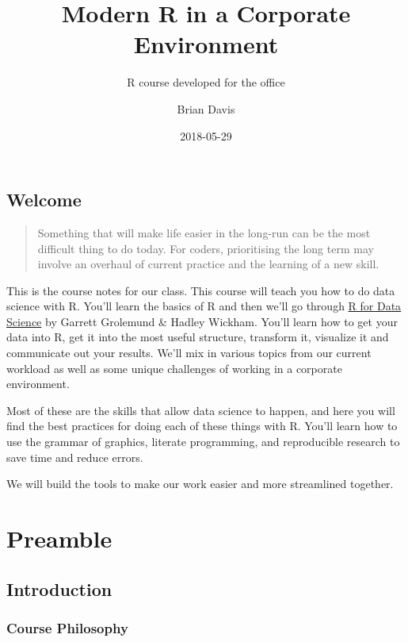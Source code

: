 \documentclass[]{book}
\title{Modern R in a Corporate Environment}
\subtitle{R course developed for the office}
\author{Brian Davis}
\date{2018-05-29}
\theoremstyle{definition}
\theoremstyle{definition}
\theoremstyle{definition}
\theoremstyle{remark}
\begin{document}
\maketitle

{
\setcounter{tocdepth}{1}
\tableofcontents
}
\chapter*{Welcome}\label{welcome}

\begin{quote}
Something that will make life easier in the long-run can be the most
difficult thing to do today. For coders, prioritising the long term may
involve an overhaul of current practice and the learning of a new skill.
\end{quote}

This is the course notes for our class. This course will teach you how
to do data science with R. You'll learn the basics of R and then we'll
go through \href{http://r4ds.had.co.nz/index.html}{R for Data Science}
by Garrett Grolemund \& Hadley Wickham. You'll learn how to get your
data into R, get it into the most useful structure, transform it,
visualize it and communicate out your results. We'll mix in various
topics from our current workload as well as some unique challenges of
working in a corporate environment.

Most of these are the skills that allow data science to happen, and here
you will find the best practices for doing each of these things with R.
You'll learn how to use the grammar of graphics, literate programming,
and reproducible research to save time and reduce errors.

We will build the tools to make our work easier and more streamlined
together.

\part{Preamble}\label{part-preamble}

\chapter{Introduction}\label{preamble-intro}

\section{Course Philosophy}\label{course-philosophy}
\end{document}
